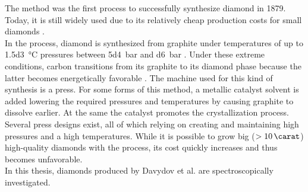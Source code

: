 	The \HPHT method was the first process to successfully synthesize diamond in 1879.
	Today, it is still widely used due to its relatively cheap production costs for small diamonds \cite{wikiSyntheticDiamond}.
	\\
	In the \HPHT process, diamond is synthesized from graphite under temperatures of up to \SI{1.5d3}{\celsius} pressures between \SI{5d4}{bar} and \SI{d6}{bar} \cite{davis1993diamond}. Under these extreme conditions, carbon transitions from its graphite to its diamond phase because the latter becomes energetically favorable \cite{liander1955artificial, bundy1955man, bovenkerk1993errors, bovenkerk1959preparation}.
	The machine used for this kind of synthesis is a press.
	For some forms of this method, a metallic catalyst solvent is added lowering the required pressures and temperatures by causing graphite to dissolve earlier. At the same the catalyst promotes the crystallization process.
	Several press designs exist, all of which relying on creating and maintaining high pressures and a high temperatures.
	While it is possible to grow big ($> \SI{10}{\carat}$) high-quality diamonds with the \HPHT process, its cost quickly increases and thus becomes unfavorable.
	\\
	In this thesis, \HPHT \nds diamonds produced by Davydov et al. \cite{Davydov2014} are spectroscopically investigated.



